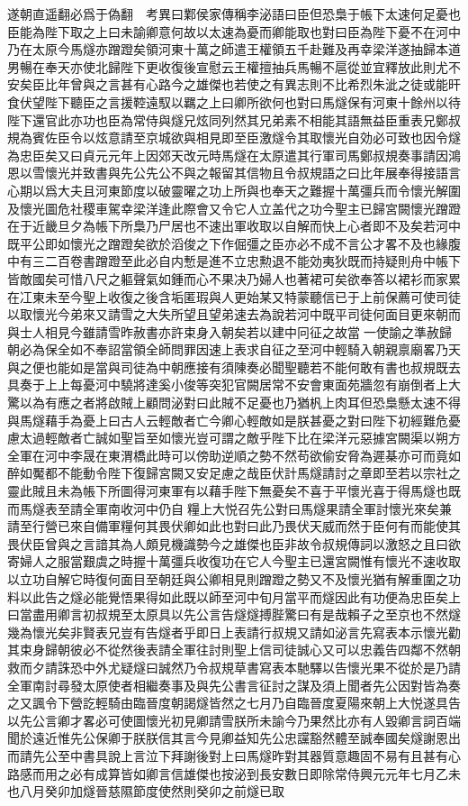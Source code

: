 遂朝直遥翻必爲于偽翻　考異曰鄴侯家傳稱李泌語曰臣但恐梟于帳下太速何足憂也臣能為陛下取之上曰未諭卿意何故以太速為憂而卿能取也對曰臣為陛下憂不在河中乃在太原今馬燧亦蹭蹬矣領河東十萬之師遣王權領五千赴難及再幸梁洋遂抽歸本道男暢在奉天亦使北歸陛下更收復後宣慰云王權擅抽兵馬暢不扈從並宜釋放此則尤不安矣臣比年曾與之言甚有心路今之雄傑也若使之有異志則不比希烈朱泚之徒或能旰食伏望陛下聽臣之言援鞚遠馭以羈之上曰卿所欲何也對曰馬燧保有河東十餘州以待陛下還官此亦功也臣為常侍與燧兄炫同列然其兄弟素不相能其語無益臣重表兄鄭叔規為賓佐臣令以炫意請至京城欲與相見即至臣激燧令其取懷光自効必可致也因令燧為忠臣矣又曰貞元元年上因郊天改元時馬燧在太原遣其行軍司馬鄭叔規奏事請因鴻恩以雪懷光并致書與先公先公不與之報留其信物且令叔規語之曰比年展奉得接語言心期以爲大夫且河東節度以破靈曜之功上所與也奉天之難握十萬彊兵而令懷光解圍及懷光圖危社稷車駕幸梁洋逢此際會又令它人立盖代之功今聖主已歸宮闕懷光蹭蹬在于近畿旦夕為帳下所梟乃尸居也不速出軍收取以自解而快上心者即不及矣若河中既平公即如懷光之蹭蹬矣欲於滔俊之下作倔彊之臣亦必不成不言公才畧不及也緣腹中有三二百卷書蹭蹬至此必自内慙是進不立忠勲退不能効夷狄既而持疑則舟中帳下皆敵國矣可惜八尺之軀聲氣如鍾而心不果决乃婦人也著裙可矣欲奉答以裙衫而家累在冮東未至今聖上收復之後含垢匿瑕與人更始某又特蒙聽信已于上前保薦可使司徒以取懷光今弟來又請雪之大失所望且望弟速去為說若河中既平司徒何面目更來朝而與士人相見今雖請雪昨赦書亦許束身入朝矣若以建中冋征之故當一使諭之準赦歸朝必為保全如不奉詔當領全師問罪因速上表求自征之至河中輕騎入朝親禀廟畧乃天與之便也能如是當與司徒為中朝應接有須陳奏必聞聖聽若不能何敢有書也叔規既去具奏于上上每憂河中驍將達奚小俊等突犯官闕居常不安會東面苑牆忽有崩倒者上大驚以為有應之者將啟賊上顧問泌對曰此賊不足憂也乃猶杋上肉耳但恐梟懸太速不得與馬燧藉手為憂上曰古人云輕敵者亡今卿心輕敵如是朕甚憂之對曰陛下初經難危憂慮太過輕敵者亡誠如聖旨至如懷光豈可謂之敵乎陛下比在梁洋元惡據宮闕渠以朔方全軍在河中李晟在東渭橋此時可以傍助逆順之勢不然苟欲偷安脅為遲棊亦可而竟如醉如魘都不能動令陛下復歸宮闕又安足慮之哉臣伏計馬燧請討之章即至若以宗社之靈此賊且未為帳下所圖得河東軍有以藉手陛下無憂矣不喜于平懷光喜于得馬燧也既而馬燧表至請全軍南收河中仍自糧上大悦召先公對曰馬燧果請全軍討懷光來矣兼請至行營已來自備軍糧何其畏伏卿如此也對曰此乃畏伏天威而然于臣何有而能使其畏伏臣曾與之言諳其為人頗見機識勢今之雄傑也臣非故令叔規傳詞以激怒之且曰欲寄婦人之服當艱虞之時握十萬彊兵收復功在它人今聖主已還宮闕惟有懷光不速收取以立功自解它時復何面目至朝廷與公卿相見則蹭蹬之勢又不及懷光猶有解重圍之功料以此告之燧必能覺悟果得如此既以師至河中旬月當平而燧因此有功便為忠臣矣上曰當盡用卿言初叔規至太原具以先公言告燧燧搏䏶驚曰有是哉賴子之至京也不然燧幾為懷光矣非賢表兄豈有告燧者乎即日上表請行叔規又請如泌言先寫表本示懷光勸其束身歸朝彼必不從然後表請全軍往討則聖上信司徒誠心又可以忠義告四鄰不然朝救而夕請誅恐中外尤疑燧曰誠然乃令叔規草書寫表本馳驛以告懷光果不從於是乃請全軍南討尋發太原使者相繼奏事及與先公書言征討之謀及須上聞者先公因對皆為奏之又諷令下營訖輕騎由臨晉度朝謁燧皆然之七月乃自臨晉度夏陽來朝上大悦遂具告以先公言卿才畧必可使圖懷光初見卿請雪朕所未諭今乃果然比亦有人毀卿言詞百端聞於遠近惟先公保卿于朕朕信其言今見卿益知先公忠讜豁然體至誠奉國矣燧謝恩出而請先公至中書具說上言泣下拜謝後對上曰馬燧昨對其器質意趣固不易有且甚有心路感而用之必有成算皆如卿言信雄傑也按泌到長安數日即除常侍興元元年七月乙未也八月癸卯加燧晉慈隰節度使然則癸卯之前燧已取
